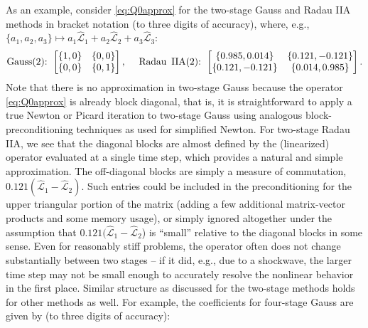 \documentclass[review]{siamart}
\begin{document}
As an example, consider \eqref{eq:Q0approx} for the two-stage Gauss and
Radau IIA methods in bracket notation (to three digits of accuracy),
where, e.g., $\{a_1,a_2,a_3\}\mapsto
a_1\widehat{\mathcal{L}}_1 + a_2\widehat{\mathcal{L}}_2 + a_3\widehat{\mathcal{L}}_3$:
%
\begin{align*}
\textnormal{Gauss(2):} \hspace{1ex}
	\begin{bmatrix}
	\{1,0\} & \{0,0\} \\
	 \{0,0\} & \{0,1\} \\
	\end{bmatrix},
	\hspace{3ex}
\textnormal{Radau\, IIA(2):} \hspace{1ex}
	\begin{bmatrix}
	\{0.985,0.014\} & \{0.121,-0.121\}\\
	\{0.121,-0.121\} & \{0.014,0.985\}\\
	\end{bmatrix}.
\end{align*}
%
Note that there is no approximation in two-stage Gauss because the operator
\eqref{eq:Q0approx} is already block diagonal, that is, it is straightforward to
apply a true Newton or Picard iteration to two-stage Gauss using analogous
block-preconditioning techniques as used for simplified Newton. For two-stage
Radau IIA, we see that the diagonal blocks are almost defined by the (linearized)
operator evaluated at a single time step, which provides a natural and simple
approximation. The off-diagonal blocks are simply a measure of commutation,
$0.121(\widehat{\mathcal{L}}_1 - \widehat{\mathcal{L}}_2)$. Such entries could
be included in the preconditioning for the upper triangular portion of the
matrix (adding a few additional matrix-vector products and some memory usage),
or simply ignored altogether under the assumption that
$0.121(\widehat{\mathcal{L}}_1 - \widehat{\mathcal{L}}_2$) is ``small'' relative
to the diagonal blocks in some sense. Even for reasonably stiff problems, the
operator often does not change substantially between two stages -- if it did,
e.g., due to a shockwave, the larger time step may not be small enough to
accurately resolve the nonlinear behavior in the first place. Similar structure
as discussed for the two-stage methods holds for other methods as well. For
example, the coefficients for four-stage Gauss are given by (to three digits of
accuracy):
%
\end{document}
